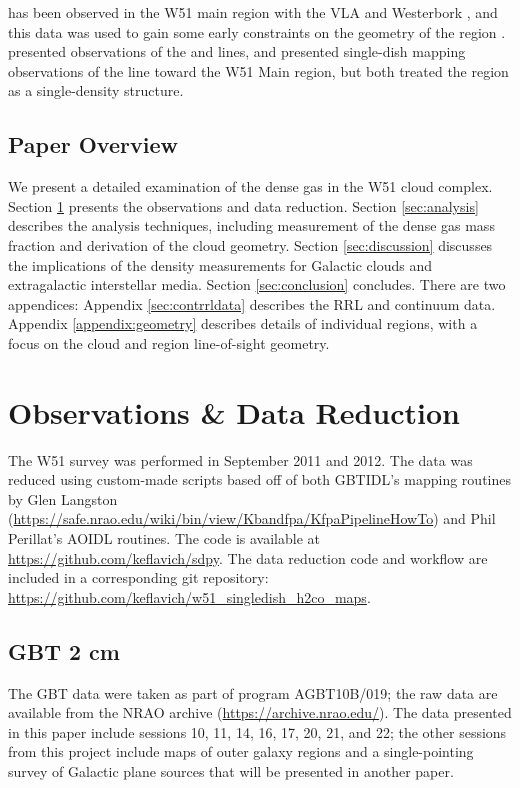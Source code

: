 \formaldehyde \oneone has been observed in the W51 main region with the VLA
\citep{Martin-Pintado1985a} and Westerbork \citep{Arnal1985a}, and this data
was used to gain some early constraints on the geometry of the region
\citep[e.g.][]{Carpenter1998a}.  \citet{Henkel1980a} presented observations of
the \oneone and \twotwo lines, and \citet{Martin-Pintado1985b} presented
single-dish mapping observations of the \formaldehyde \twotwo line toward the
W51 Main region, but both treated the region as a single-density structure.


\subsection{Paper Overview} 
We present a detailed examination of the dense gas in the W51 cloud complex.
Section \ref{sec:observations} presents the observations and data reduction.
Section \ref{sec:analysis} describes the analysis techniques, including
measurement of the dense gas mass fraction and derivation of the cloud
geometry.  Section \ref{sec:discussion} discusses the implications of the
density measurements for Galactic clouds and extragalactic interstellar media.
Section \ref{sec:conclusion} concludes.  There are two appendices: Appendix
\ref{sec:contrrldata} describes the RRL and continuum data.  Appendix
\ref{appendix:geometry} describes details of individual regions, with a focus on
the cloud and \hii region line-of-sight geometry.


\section{Observations \& Data Reduction}
\label{sec:observations}
The W51 survey was performed in September 2011 and 2012.  
The data was reduced using custom-made scripts based off of both GBTIDL's
mapping routines by Glen Langston
(\url{https://safe.nrao.edu/wiki/bin/view/Kbandfpa/KfpaPipelineHowTo}) and Phil
Perillat's AOIDL routines.  The code is available at
\url{https://github.com/keflavich/sdpy}.  The data reduction code and workflow
are included in a corresponding git repository:
\url{https://github.com/keflavich/w51_singledish_h2co_maps}.


\subsection{GBT 2 cm}
The GBT data were
taken as part of program AGBT10B/019; the raw data are available from the NRAO
archive (\url{https://archive.nrao.edu/}).  The data presented in this paper
include sessions 10, 11, 14, 16, 17, 20, 21, and 22; the other sessions from
this project include maps of outer galaxy regions and a single-pointing survey
of Galactic plane sources that will be presented in another paper. 

